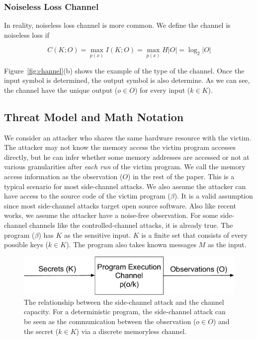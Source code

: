 \subsubsection{Noiseless Loss Channel}
In reality, noiseless loss channel is more common. We define the channel is noiseless loss if

\begin{equation} \label{chapter:eq:5}
  C(K;O) = \max_{p(x)} I(K;O) = \max_{p(x)} H |O| = \log_2 {|O|}
\end{equation}

Figure~\ref{fig:channel}(b) shows the example of the type of the channel. Once the input symbol is determined, the output symbol is also determine. As we can see, the channel have the unique output ($o \in O$) for every input ($k \in K$).


\subsection{Threat Model and Math Notation}


We consider an attacker who shares the same hardware resource with the victim. The attacker may not know the memory access the victim program accesses directly, but he can infer whether some memory addresses are accessed or not at various granularities after \textit{each run} of the victim program. We call the memory access information as the observation ($O$) in the rest of the paper. This is a typical scenario for most side-channel attacks.  We also assume the attacker can have access to the source code of the victim program ($\beta$). It is a valid assumption since most side-channel attacks target open source software. Also like recent works, we assume the attacker have a noise-free observation. For some side-channel channels like the controlled-channel attacks, it is already true. The program ($\beta$) has $K$ as the sensitive input. $K$ is a finite set that consists of every possible keys ($k \in K$). The program also takes known messages $M$ as the input.

\begin{figure}[ht]
  \centering
  \includegraphics[width=.8\columnwidth]{./figures/chapter5/channel.pdf}
  \caption{The relationship between the side-channel attack and the channel capacity. For a deterministic program, the side-channel attack can be seen as the communication between the observation ($o \in O$) and the secret ($k \in K$) via a discrete memoryless channel.}
  \label{fig:side_channel}
\end{figure}

